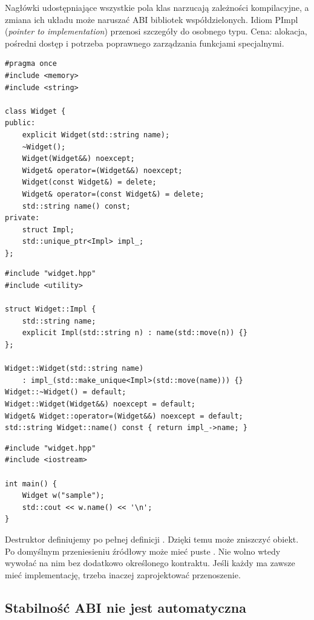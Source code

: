 Nagłówki udostępniające wszystkie pola klas narzucają zależności
kompilacyjne, a zmiana ich układu może naruszać ABI bibliotek
współdzielonych. Idiom PImpl (\emph{pointer to implementation})
przenosi szczegóły do osobnego typu. Cena: alokacja, pośredni dostęp
i potrzeba poprawnego zarządzania funkcjami specjalnymi.

\begin{lstlisting}[caption={widget.hpp -- publiczny naglowek.}]
#pragma once
#include <memory>
#include <string>

class Widget {
public:
    explicit Widget(std::string name);
    ~Widget();
    Widget(Widget&&) noexcept;
    Widget& operator=(Widget&&) noexcept;
    Widget(const Widget&) = delete;
    Widget& operator=(const Widget&) = delete;
    std::string name() const;
private:
    struct Impl;
    std::unique_ptr<Impl> impl_;
};
\end{lstlisting}

\begin{lstlisting}[caption={widget.cpp -- pelna definicja ukrytego typu.}]
#include "widget.hpp"
#include <utility>

struct Widget::Impl {
    std::string name;
    explicit Impl(std::string n) : name(std::move(n)) {}
};

Widget::Widget(std::string name)
    : impl_(std::make_unique<Impl>(std::move(name))) {}
Widget::~Widget() = default;
Widget::Widget(Widget&&) noexcept = default;
Widget& Widget::operator=(Widget&&) noexcept = default;
std::string Widget::name() const { return impl_->name; }
\end{lstlisting}

\begin{lstlisting}[caption={main.cpp -- uzycie niezalezne od szczegolow Impl.}]
#include "widget.hpp"
#include <iostream>

int main() {
    Widget w("sample");
    std::cout << w.name() << '\n';
}
\end{lstlisting}

Destruktor  definiujemy po pełnej definicji .
Dzięki temu  może zniszczyć obiekt.
Po domyślnym przeniesieniu źródłowy  może mieć puste
. Nie wolno wtedy wywołać na nim  bez
dodatkowo określonego kontraktu. Jeśli każdy  ma zawsze
mieć implementację, trzeba inaczej zaprojektować przenoszenie.

\subsection{Stabilność ABI nie jest automatyczna}

